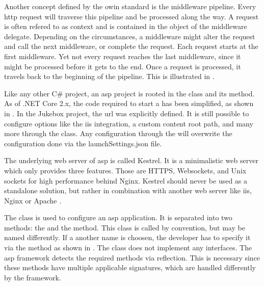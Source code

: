 Another concept defined by the \gls{owin} standard is the middleware pipeline. Every \gls{http} request will traverse this pipeline and be processed along the way. A request is often refered to as context and is contained in the  object of the middleware delegate. Depending on the circumstances, a middleware might alter the request and call the next middleware, or complete the request. Each request starts at the first middleware. Yet not every request reaches the last middleware, since it might be processed before it gets to the end. Once a request is processed, it travels back to the beginning of the pipeline. This is illustrated in .



Like any other C\# project, an \gls{asp} project is rooted in the  class and its  method. As of .NET Core 2.x, the code required to start a  has been simplified, as shown in  \cite{aspFundamentals}. In the Jukebox project, the \gls{url} was explicitly defined. It is still possible to configure options like the \gls{iis} integration, a custom content root path, and many more through the  class. Any configuration through the  will overwrite the configuration done via the launchSettings.json file.

The underlying web server of \gls{asp} is called Kestrel. It is a minimalistic web server which only provides three features. Those are HTTPS, Websockets, and Unix sockets for high performance behind Nginx. Kestrel should never be used as a standalone solution, but rather in combination with another web server like \gls{iis}, Nginx or Apache \cite{kestrel}.




The  class is used to configure an \gls{asp} application. It is separated into two methods: the  and the  method. This class is called  by convention, but may be named differently. If a another name is choosen, the developer has to specify it via the  method as shown in . The  class does not implement any interfaces. The \gls{asp} framework detects the required methods via reflection. This is necessary since these methods have multiple applicable signatures, which are handled differently by the framework.

